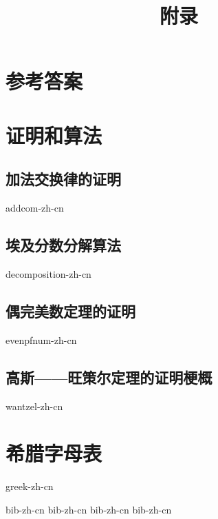 \documentclass[b5paper]{ctexart}
\begin{document}
\title{附录}

\maketitle
\fi

\chapter{参考答案}
\label{ch:answers}
\shipoutAnswer

\chapter{证明和算法}

\section{加法交换律的证明}
{addcom-zh-cn}

\section{埃及分数分解算法}
{decomposition-zh-cn}

\section{偶完美数定理的证明}
{evenpfnum-zh-cn}

\section{高斯——旺策尔定理的证明梗概}
{wantzel-zh-cn}

\chapter{希腊字母表} \label{ch:greek-letters}
{greek-zh-cn}

\markboth{\bibname}{}

\begin{thebibliography}{99}
  {bib-zh-cn}
  {bib-zh-cn}
  {bib-zh-cn}
  {bib-zh-cn}
\end{thebibliography}

\ifx\wholebook\relax \else
\expandafter\enddocument
\fi
\end{document}
